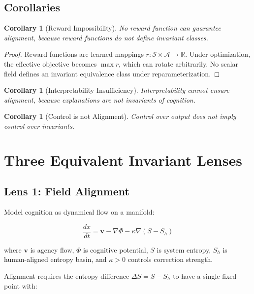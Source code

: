 \documentclass[11pt,a4paper]{article}
\theoremstyle{plain}
\newtheorem{corollary}[theorem]{Corollary}
\theoremstyle{definition}
\numberwithin{equation}{section}
\begin{document}
\subsection{Corollaries}

\begin{corollary}[Reward Impossibility]
No reward function can guarantee alignment, because reward functions do not define invariant classes.
\end{corollary}

\begin{proof}
Reward functions are learned mappings $r: \mathcal{S} \times \mathcal{A} \to \mathbb{R}$. Under optimization, the effective objective becomes $\max r$, which can rotate arbitrarily. No scalar field defines an invariant equivalence class under reparameterization.
\end{proof}

\begin{corollary}[Interpretability Insufficiency]
Interpretability cannot ensure alignment, because explanations are not invariants of cognition.
\end{corollary}

\begin{corollary}[Control is not Alignment]
Control over output does not imply control over invariants.
\end{corollary}


\section{Three Equivalent Invariant Lenses}

\subsection{Lens 1: Field Alignment}

Model cognition as dynamical flow on a manifold:

\[
\frac{dx}{dt} = \mathbf{v} - \nabla \Phi - \kappa \nabla (S-S_h)
\]

where $\mathbf{v}$ is agency flow, $\Phi$ is cognitive potential, $S$ is system entropy, $S_h$ is human-aligned entropy basin, and $\kappa > 0$ controls correction strength.

Alignment requires the entropy difference $\Delta S = S - S_h$ to have a single fixed point with:
\end{document}
